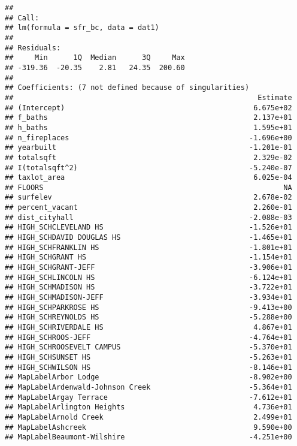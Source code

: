 \documentclass[]{article}
\begin{document}
\begin{verbatim}
## 
## Call:
## lm(formula = sfr_bc, data = dat1)
## 
## Residuals:
##     Min      1Q  Median      3Q     Max 
## -319.36  -20.35    2.81   24.35  200.60 
## 
## Coefficients: (7 not defined because of singularities)
##                                                         Estimate
## (Intercept)                                            6.675e+02
## f_baths                                                2.137e+01
## h_baths                                                1.595e+01
## n_fireplaces                                          -1.696e+00
## yearbuilt                                             -1.201e-01
## totalsqft                                              2.329e-02
## I(totalsqft^2)                                        -5.240e-07
## taxlot_area                                            6.025e-04
## FLOORS                                                        NA
## surfelev                                               2.678e-02
## percent_vacant                                         2.260e-01
## dist_cityhall                                         -2.088e-03
## HIGH_SCHCLEVELAND HS                                  -1.526e+01
## HIGH_SCHDAVID DOUGLAS HS                              -1.465e+01
## HIGH_SCHFRANKLIN HS                                   -1.801e+01
## HIGH_SCHGRANT HS                                      -1.154e+01
## HIGH_SCHGRANT-JEFF                                    -3.906e+01
## HIGH_SCHLINCOLN HS                                    -6.124e+01
## HIGH_SCHMADISON HS                                    -3.722e+01
## HIGH_SCHMADISON-JEFF                                  -3.934e+01
## HIGH_SCHPARKROSE HS                                   -9.413e+00
## HIGH_SCHREYNOLDS HS                                   -5.288e+00
## HIGH_SCHRIVERDALE HS                                   4.867e+01
## HIGH_SCHROOS-JEFF                                     -4.764e+01
## HIGH_SCHROOSEVELT CAMPUS                              -5.370e+01
## HIGH_SCHSUNSET HS                                     -5.263e+01
## HIGH_SCHWILSON HS                                     -8.146e+01
## MapLabelArbor Lodge                                   -8.902e+00
## MapLabelArdenwald-Johnson Creek                       -5.364e+01
## MapLabelArgay Terrace                                 -7.612e+01
## MapLabelArlington Heights                              4.736e+01
## MapLabelArnold Creek                                   2.499e+01
## MapLabelAshcreek                                       9.590e+00
## MapLabelBeaumont-Wilshire                             -4.251e+00

\end{verbatim}
\end{document}
